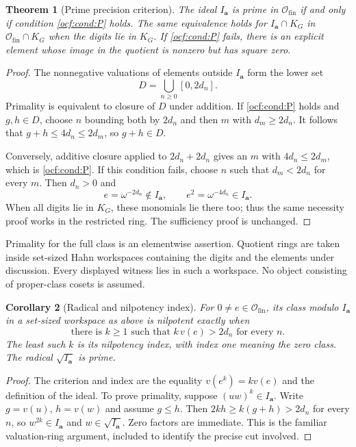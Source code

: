 \documentclass[11pt,a4paper]{article}
\numberwithin{equation}{section}
\newtheorem{theorem}{Theorem}[section]
\newtheorem{corollary}[theorem]{Corollary}
\theoremstyle{definition}
\theoremstyle{remark}
\newcommand{\Ofin}{\mathcal O_{\mathrm{fin}}}%
\newcommand{\codea}{\boldsymbol a}
\begin{document}
\begin{theorem}[Prime precision criterion]\label{ocf:thm:prime}
The ideal $I_{\codea}$ is prime in $\Ofin$ if and only if condition
\eqref{ocf:cond:P} holds. The same equivalence holds for
$I_{\codea}\cap K_G$ in $\Ofin\cap K_G$ when the digits lie in $K_G$.
If \eqref{ocf:cond:P} fails, there is an explicit element whose image in the
quotient is nonzero but has square zero.
\end{theorem}
\begin{proof}
The nonnegative valuations of elements outside $I_{\codea}$ form the lower
set
\[
 D=\bigcup_{n\ge0}[0,2d_n].
\]
Primality is equivalent to closure of $D$ under addition. If
\eqref{ocf:cond:P} holds and $g,h\in D$, choose $n$ bounding both by $2d_n$
and then $m$ with $d_m\ge2d_n$. It follows that
$g+h\le4d_n\le2d_m$, so $g+h\in D$.

Conversely, additive closure applied to $2d_n+2d_n$ gives an $m$ with
$4d_n\le2d_m$, which is \eqref{ocf:cond:P}.
If this condition fails, choose $n$ such that $d_m<2d_n$ for every $m$.
Then $d_n>0$ and
\[
 e=\omega^{-2d_n}\notin I_{\codea},\qquad
 e^2=\omega^{-4d_n}\in I_{\codea}.
\]
When all digits lie in $K_G$, these monomials lie there too; thus the same
necessity proof works in the restricted ring. The sufficiency proof is
unchanged.
\end{proof}

Primality for the full class is an elementwise assertion. Quotient rings
are taken inside set-sized Hahn workspaces containing the digits and the
elements under discussion. Every displayed witness lies in such a
workspace. No object consisting of proper-class cosets is assumed.

\begin{corollary}[Radical and nilpotency index]\label{ocf:cor:radical}
For $0\ne e\in\Ofin$, its class modulo $I_{\codea}$ in a set-sized
workspace as above is nilpotent exactly when
\begin{equation}\label{ocf:eq:nilpotency}
 \text{there is }k\ge1\text{ such that }k\,v(e)>2d_n
 \text{ for every }n.
\end{equation}
The least such $k$ is its nilpotency index, with index one meaning the zero
class. The radical $\sqrt{I_{\codea}}$ is prime.
\end{corollary}
\begin{proof}
The criterion and index are the equality $v(e^k)=kv(e)$ and the definition
of the ideal. To prove primality, suppose $(uw)^k\in I_{\codea}$.
Write $g=v(u)$, $h=v(w)$ and assume $g\le h$. Then
$2kh\ge k(g+h)>2d_n$ for every $n$, so $w^{2k}\in I_{\codea}$ and
$w\in\sqrt{I_{\codea}}$. Zero factors are immediate. This is the familiar
valuation-ring argument, included to identify the precise cut involved.
\end{proof}
\end{document}
